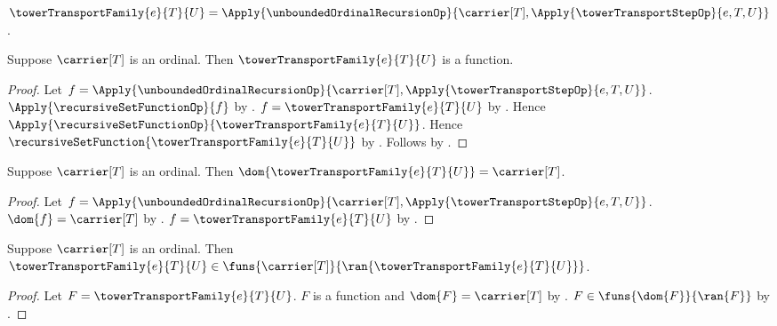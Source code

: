 \begin{definition}\label{tower_transport_family}
    $\towerTransportFamily{e}{T}{U}=
        \Apply{\unboundedOrdinalRecursionOp}
            {\carrier[T],\Apply{\towerTransportStepOp}{e,T,U}}$.
\end{definition}

\begin{proposition}\label{tower_transport_family_function}
    Suppose $\carrier[T]$ is an ordinal.
    Then $\towerTransportFamily{e}{T}{U}$ is a function.
\end{proposition}
\begin{proof}
    Let $f=\Apply{\unboundedOrdinalRecursionOp}
        {\carrier[T],\Apply{\towerTransportStepOp}{e,T,U}}$.
    $\Apply{\recursiveSetFunctionOp}{f}$ by
        .
    $f=\towerTransportFamily{e}{T}{U}$ by
        .
    Hence $\Apply{\recursiveSetFunctionOp}{
        \towerTransportFamily{e}{T}{U}}$.
    Hence $\recursiveSetFunction{\towerTransportFamily{e}{T}{U}}$ by
        .
    Follows by .
\end{proof}

\begin{proposition}\label{tower_transport_family_domain}
    Suppose $\carrier[T]$ is an ordinal.
    Then $\dom{\towerTransportFamily{e}{T}{U}}=\carrier[T]$.
\end{proposition}
\begin{proof}
    Let $f=\Apply{\unboundedOrdinalRecursionOp}
        {\carrier[T],\Apply{\towerTransportStepOp}{e,T,U}}$.
    $\dom{f}=\carrier[T]$ by
        .
    $f=\towerTransportFamily{e}{T}{U}$ by
        .
\end{proof}

\begin{proposition}\label{tower_transport_family_type}
    Suppose $\carrier[T]$ is an ordinal.
    Then $\towerTransportFamily{e}{T}{U}\in
        \funs{\carrier[T]}{\ran{\towerTransportFamily{e}{T}{U}}}$.
\end{proposition}
\begin{proof}
    Let $F=\towerTransportFamily{e}{T}{U}$.
    $F$ is a function and $\dom{F}=\carrier[T]$ by
        .
    $F\in\funs{\dom{F}}{\ran{F}}$ by
        .
\end{proof}

